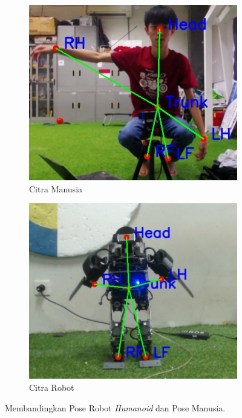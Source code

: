\begin{figure}
  \centering
  \begin{subfigure}[b]{0.45\textwidth}
      \centering
      \includegraphics[width=\textwidth]{gambar/human_10_result.jpg}
      \caption{Citra Manusia}
      \label{fig:humanimagea}
  \end{subfigure}
  \hfill
  \begin{subfigure}[b]{0.45\textwidth}
      \centering
      \includegraphics[width=\textwidth]{gambar/robot_6_result.jpg}
      \caption{Citra Robot}
      \label{fig:robotimagea}
  \end{subfigure}
     \caption{Membandingkan Pose Robot \textit{Humanoid} dan Pose Manusia.}
     \label{fig:comparinga}
\end{figure}

